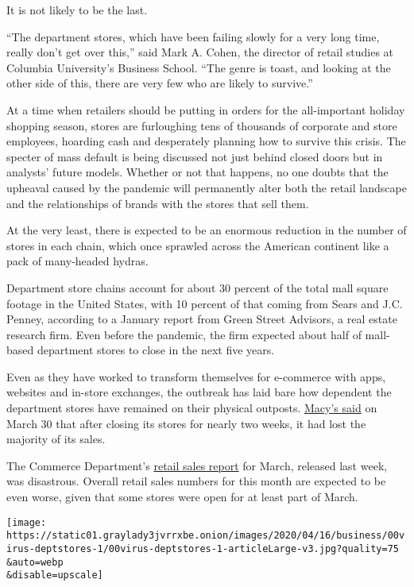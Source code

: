 It is not likely to be the last.

``The department stores, which have been failing slowly for a very long
time, really don't get over this,'' said Mark A. Cohen, the director of
retail studies at Columbia University's Business School. ``The genre is
toast, and looking at the other side of this, there are very few who are
likely to survive.''

At a time when retailers should be putting in orders for the
all-important holiday shopping season, stores are furloughing tens of
thousands of corporate and store employees, hoarding cash and
desperately planning how to survive this crisis. The specter of mass
default is being discussed not just behind closed doors but in analysts'
future models. Whether or not that happens, no one doubts that the
upheaval caused by the pandemic will permanently alter both the retail
landscape and the relationships of brands with the stores that sell
them.

At the very least, there is expected to be an enormous reduction in the
number of stores in each chain, which once sprawled across the American
continent like a pack of many-headed hydras.

Department store chains account for about 30 percent of the total mall
square footage in the United States, with 10 percent of that coming from
Sears and J.C. Penney, according to a January report from Green Street
Advisors, a real estate research firm. Even before the pandemic, the
firm expected about half of mall-based department stores to close in the
next five years.

Even as they have worked to transform themselves for e-commerce with
apps, websites and in-store exchanges, the outbreak has laid bare how
dependent the department stores have remained on their physical
outposts.
\href{https://www.macysinc.com/news-media/press-releases/detail/1618/macys-inc-provides-business-update-in-response-to}{Macy's
said} on March 30 that after closing its stores for nearly two weeks, it
had lost the majority of its sales.

The Commerce Department's
\href{https://www.nytimes3xbfgragh.onion/2020/04/15/business/economy/coronavirus-retail-sales.html}{retail
sales report} for March, released last week, was disastrous. Overall
retail sales numbers for this month are expected to be even worse, given
that some stores were open for at least part of March.

\texttt{[image: https://static01.graylady3jvrrxbe.onion/images/2020/04/16/business/00virus-deptstores-1/00virus-deptstores-1-articleLarge-v3.jpg?quality=75\\\&auto=webp\\\&disable=upscale]}

